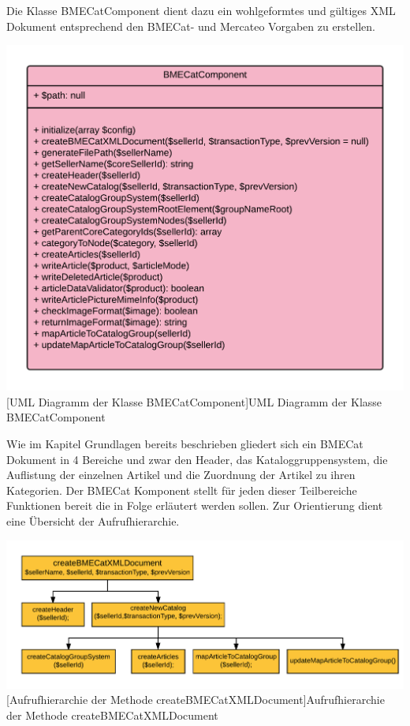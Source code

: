 	Die Klasse BMECatComponent dient dazu ein wohlgeformtes und gültiges XML Dokument entsprechend den BMECat- und Mercateo Vorgaben zu erstellen. \\
	\begin{minipage}{\linewidth}
		\vspace{1em}
		\centering
		\includegraphics[width=0.8 \linewidth]{img/BMECatComponentUML}
		[UML Diagramm der Klasse BMECatComponent]{UML Diagramm der Klasse BMECatComponent}
		\vspace{1em}
	\end{minipage}
	Wie im Kapitel Grundlagen bereits beschrieben gliedert sich ein BMECat Dokument in 4 Bereiche und zwar den Header, das Kataloggruppensystem, die Auflistung der einzelnen Artikel und die Zuordnung der Artikel zu ihren Kategorien. Der BMECat Komponent stellt für jeden dieser Teilbereiche Funktionen bereit die in Folge erläutert werden sollen.
	Zur Orientierung dient eine Übersicht der Aufrufhierarchie.\\
	
	\begin{minipage}{\linewidth}
		\vspace{1em}
		\centering
		\includegraphics[width=0.8 \linewidth]{img/createBMECatHierarchie}
		[Aufrufhierarchie der Methode createBMECatXMLDocument]{Aufrufhierarchie der Methode createBMECatXMLDocument}
		\vspace{1em}
	\end{minipage}
	
